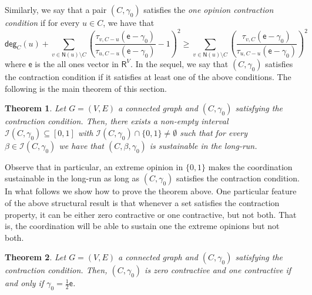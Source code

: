 \documentclass[letterpaper,11pt]{article}
\newcommand{\RR}{\mathsf{R}}
\newcommand{\EE}{\mathsf{E}}
\newcommand{\nsf}{\mathsf{N}}
\newcommand{\degsf}{\mathsf{deg}}
\newtheorem{theorem}{Theorem}
\newcommand{\vvcom}[1]{\todo[color=red!25!white]{Victor: #1}}
\begin{document}
Similarly, we say that a pair $(C,\gamma_0)$ satisfies the {\it one opinion contraction condition} if for every $u\in C$, we have that 
\begin{equation*}
\degsf_C(u) + \sum_{v\in \nsf(u)\setminus C}\left(\frac{\tau_{v,C-u}(\mathsf{e}-\gamma_0)}{\tau_{u,C-u}(\mathsf{e}-\gamma_0)}-1\right)^2\ge \sum_{v\in \nsf(u)\setminus C}\left(\frac{\tau_{v,C}(\mathsf{e}-\gamma_0)}{\tau_{u,C-u}(\mathsf{e}-\gamma_0)}\right)^2
\end{equation*}
where $\mathsf{e}$ is the all ones vector in $\RR^V$.
In the sequel, we say that $(C,\gamma_0)$ satisfies the contraction condition if it satisfies at least one of the above conditions.
The following is the main theorem of this section.
\begin{theorem}
\label{thm:longrun}
Let $G=(V,E)$ a connected graph and $(C,\gamma_0)$ satisfying the contraction condition.
Then, there exists a non-empty interval $\mathcal{I}(C,\gamma_0)\subseteq [0,1]$ with $\mathcal{I}(C,\gamma_0)\cap \{0,1\}\ne \emptyset$ such that for every $\beta\in \mathcal{I}(C,\gamma_0)$ we have that $(C,\beta,\gamma_0)$ is sustainable in the long-run.  
\end{theorem}
Observe that in particular, an extreme opinion in $\{0,1\}$ makes the coordination sustainable in the long-run as long as $(C,\gamma_0)$ satisfies the contraction condition. 
In what follows we show how to prove the theorem above. 
One particular feature of the above structural result is that whenever a set satisfies the contraction property, it can be either zero contractive or one contractive, but not both.
That is, the coordination will be able to sustain one the extreme opinions but not both.

\begin{theorem}
\label{thm:alternatives}
Let $G=(V,E)$ a connected graph and $(C,\gamma_0)$ satisfying the contraction condition.
Then, $(C,\gamma_0)$ is zero contractive and one contractive if and only if $\gamma_0=\frac{1}{2}\mathsf{e}$.
\end{theorem}
\end{document}
